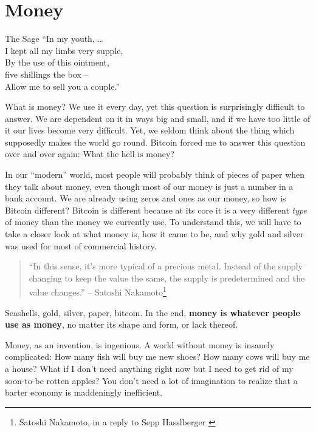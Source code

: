 \chapter{Money}
\label{les:11}

\begin{chapquote}{The Sage}
``In my youth, \ldots \\
I kept all my limbs very supple, \\
By the use of this ointment, \\
five shillings the box -- \\
Allow me to sell you a couple.''
\end{chapquote}

What is money? We use it every day, yet this question is surprisingly
difficult to answer. We are dependent on it in ways big and small, and
if we have too little of it our lives become very difficult. Yet, we
seldom think about the thing which supposedly makes the world go round.
Bitcoin forced me to answer this question over and over again: What the
hell is money?

In our \enquote{modern} world, most people will probably think of pieces of
paper when they talk about money, even though most of our money is just
a number in a bank account. We are already using zeros and ones as our
money, so how is Bitcoin different? Bitcoin is different because at its
core it is a very different \textit{type} of money than the money we currently
use. To understand this, we will have to take a closer look at what
money is, how it came to be, and why gold and silver was used for most
of commercial history.

\begin{samepage}\begin{quotation}
``In this sense, it's more typical of a precious metal. Instead of the
supply changing to keep the value the same, the supply is
predetermined and the value changes.''
\flushright -- Satoshi Nakamoto\footnote{Satoshi Nakamoto, in a reply to Sepp Hasslberger \cite{satoshi-precious-metal}}
\end{quotation}\end{samepage}

Seashells, gold, silver, paper, bitcoin. In the end, \textbf{money is whatever
people use as money}, no matter its shape and form, or lack thereof.

Money, as an invention, is ingenious. A world without money is insanely
complicated: How many fish will buy me new shoes? How many cows will buy
me a house? What if I don't need anything right now but I need to get
rid of my soon-to-be rotten apples? You don't need a lot of imagination
to realize that a barter economy is maddeningly inefficient.

